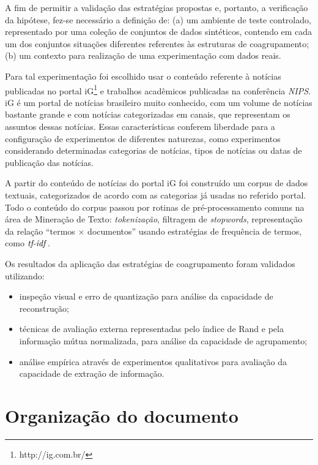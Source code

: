 \documentclass[
    12pt,                %
    oneside,            %
    a4paper,            %
    english,            %
    brazil                %
    ]{abntex2ppgsi}
\begin{document}
A fim de permitir a validação das estratégias propostas e, portanto, a verificação da hipótese, fez-se necessário a definição de: (a) um ambiente de teste controlado, representado por uma coleção de conjuntos de dados sintéticos, contendo em cada um dos conjuntos situações diferentes referentes às estruturas de coagrupamento; (b) um contexto para realização de uma experimentação com dados reais.

Para tal experimentação foi escolhido usar o conteúdo referente à notícias publicadas no portal iG\footnote{http://ig.com.br/} e trabalhos acadêmicos publicadas na conferência \textit{NIPS}.
iG é um portal de notícias brasileiro muito conhecido, com um volume de notícias bastante grande e com notícias categorizadas em canais, que representam os assuntos dessas notícias.
Essas características conferem liberdade para a configuração de experimentos de diferentes naturezas, como experimentos considerando determinadas categorias de notícias, tipos de notícias ou datas de publicação das notícias.

A partir do conteúdo de notícias do portal iG foi construído um corpus de dados textuais, categorizados de acordo com as categorias já usadas no referido portal.
Todo o conteúdo do corpus passou por rotinas de pré-processamento comuns na área de Mineração de Texto: \textit{tokenização}, filtragem de \textit{stopwords}, representação da relação ``termos $\times$ documentos'' usando estratégias de frequência de termos, como $\text{\textit{tf-idf}}$.

Os resultados da aplicação das estratégias de coagrupamento foram validados utilizando:

\begin{itemize}
    \item inspeção visual e erro de quantização para análise da capacidade de reconstrução;
    \item técnicas de avaliação externa representadas pelo índice de Rand e pela informação mútua normalizada, para análise da capacidade de agrupamento;
    \item análise empírica através de experimentos qualitativos para avaliação da capacidade de extração de informação.
\end{itemize}


\section{Organização do documento}
\end{document}
